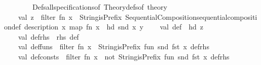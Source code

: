 \begin{isabellebody}
\ \ \ \ \ \ \ \ {\isacharparenleft}{\kern0pt}Defs{\isachardot}{\kern0pt}all{\isacharunderscore}{\kern0pt}specifications{\isacharunderscore}{\kern0pt}of\ {\isacharparenleft}{\kern0pt}Theory{\isachardot}{\kern0pt}defs{\isacharunderscore}{\kern0pt}of\ {\isacharat}{\kern0pt}{\isacharbraceleft}{\kern0pt}theory{\isacharbraceright}{\kern0pt}{\isacharparenright}{\kern0pt}{\isacharparenright}{\kern0pt}\isanewline
\ \ \ \ val\ z\ {\isacharequal}{\kern0pt}\ filter\ {\isacharparenleft}{\kern0pt}fn\ x\ {\isacharequal}{\kern0pt}{\isachargreater}{\kern0pt}\ String{\isachardot}{\kern0pt}isPrefix\ {\isacharparenleft}{\kern0pt}{\isachardoublequote}{\kern0pt}Sequential{\isacharunderscore}{\kern0pt}Composition{\isachardot}{\kern0pt}sequential{\isacharunderscore}{\kern0pt}composition{\isacharunderscore}{\kern0pt}def{\isachardoublequote}{\kern0pt}{\isacharparenright}{\kern0pt}\ {\isacharparenleft}{\kern0pt}{\isacharhash}{\kern0pt}description\ x{\isacharparenright}{\kern0pt}{\isacharparenright}{\kern0pt}\ {\isacharparenleft}{\kern0pt}map\ {\isacharparenleft}{\kern0pt}fn\ x\ {\isacharequal}{\kern0pt}{\isachargreater}{\kern0pt}\ {\isacharparenleft}{\kern0pt}hd\ {\isacharparenleft}{\kern0pt}snd\ x{\isacharparenright}{\kern0pt}{\isacharparenright}{\kern0pt}{\isacharparenright}{\kern0pt}\ y{\isacharparenright}{\kern0pt}\isanewline
\isanewline
\ \ \ \ val\ def\ {\isacharequal}{\kern0pt}\ hd\ z\isanewline
\ \ \ \ val\ def{\isacharunderscore}{\kern0pt}rhs\ {\isacharequal}{\kern0pt}\ {\isacharhash}{\kern0pt}rhs\ def\isanewline
\isanewline
\ \ \ \ val\ def{\isacharunderscore}{\kern0pt}funs\ {\isacharequal}{\kern0pt}\ filter\ {\isacharparenleft}{\kern0pt}fn\ x\ {\isacharequal}{\kern0pt}{\isachargreater}{\kern0pt}\ String{\isachardot}{\kern0pt}isPrefix\ {\isacharparenleft}{\kern0pt}{\isachardoublequote}{\kern0pt}fun{\isachardoublequote}{\kern0pt}{\isacharparenright}{\kern0pt}\ {\isacharparenleft}{\kern0pt}snd\ {\isacharparenleft}{\kern0pt}fst\ x{\isacharparenright}{\kern0pt}{\isacharparenright}{\kern0pt}{\isacharparenright}{\kern0pt}\ {\isacharparenleft}{\kern0pt}def{\isacharunderscore}{\kern0pt}rhs{\isacharparenright}{\kern0pt}\isanewline
\ \ \ \ val\ def{\isacharunderscore}{\kern0pt}consts\ {\isacharequal}{\kern0pt}\ filter\ {\isacharparenleft}{\kern0pt}fn\ x\ {\isacharequal}{\kern0pt}{\isachargreater}{\kern0pt}\ not\ {\isacharparenleft}{\kern0pt}String{\isachardot}{\kern0pt}isPrefix\ {\isacharparenleft}{\kern0pt}{\isachardoublequote}{\kern0pt}fun{\isachardoublequote}{\kern0pt}{\isacharparenright}{\kern0pt}\ {\isacharparenleft}{\kern0pt}snd\ {\isacharparenleft}{\kern0pt}fst\ x{\isacharparenright}{\kern0pt}{\isacharparenright}{\kern0pt}{\isacharparenright}{\kern0pt}{\isacharparenright}{\kern0pt}\ {\isacharparenleft}{\kern0pt}def{\isacharunderscore}{\kern0pt}rhs{\isacharparenright}{\kern0pt}\isanewline

\end{isabellebody}

